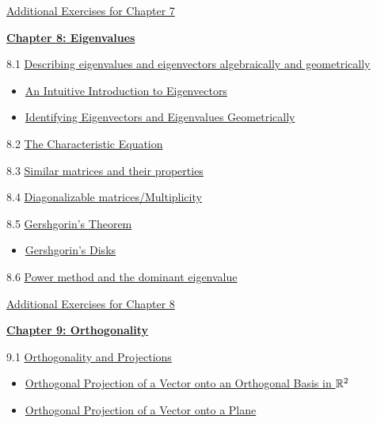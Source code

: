 \documentclass{ximera}
\begin{document}
\href{https://ximera.osu.edu/oerlinalg/LinearAlgebra/SUPX-0070/main}{Additional Exercises for Chapter 7}
	
\href{https://ximera.osu.edu/oerlinalg/LinearAlgebra/XLAChapter_eigenvalues/main}{\textbf{Chapter 8: Eigenvalues}}
	
8.1	\href{https://ximera.osu.edu/oerlinalg/LinearAlgebra/EIG-0010/main}{Describing eigenvalues and eigenvectors algebraically and geometrically}
\begin{itemize}
    \item 
    \href{https://www.geogebra.org/m/ub4kqvmz}{An Intuitive Introduction to Eigenvectors}
    \item
    \href{https://www.geogebra.org/m/vd3fydmg}{Identifying Eigenvectors and Eigenvalues Geometrically}
\end{itemize}
	
8.2	\href{https://ximera.osu.edu/oerlinalg/LinearAlgebra/EIG-0020/main}{The Characteristic Equation}
	
8.3	\href{https://ximera.osu.edu/oerlinalg/LinearAlgebra/EIG-0040/main}{Similar matrices and their properties}
	
8.4	\href{https://ximera.osu.edu/oerlinalg/LinearAlgebra/EIG-0050/main}{Diagonalizable matrices/Multiplicity}
	
8.5	\href{https://ximera.osu.edu/oerlinalg/LinearAlgebra/EIG-0080/main}{Gershgorin's Theorem}
\begin{itemize}
    \item 
    \href{https://www.geogebra.org/m/jrpqazq4}{Gershgorin's Disks}
\end{itemize}
	
8.6	\href{https://ximera.osu.edu/oerlinalg/LinearAlgebra/EIG-0070/main}{Power method and the dominant eigenvalue}
	
\href{https://ximera.osu.edu/oerlinalg/LinearAlgebra/SUPX-0080/main}{Additional Exercises for Chapter 8}
	
\href{https://ximera.osu.edu/oerlinalg/LinearAlgebra/XLAChapter_orthogonality/main}{\textbf{Chapter 9: Orthogonality}}
	
9.1	\href{https://ximera.osu.edu/oerlinalg/LinearAlgebra/RTH-0010/main}{Orthogonality and Projections}
\begin{itemize}
    \item 
    \href{https://www.geogebra.org/m/nsqzhsxv}{Orthogonal Projection of a Vector onto an Orthogonal Basis in $\mathbb{R}^2$}
   \item
   \href{https://www.geogebra.org/m/hehqyayz}{Orthogonal Projection of a Vector onto a Plane}
\end{itemize}
	
\end{document}

